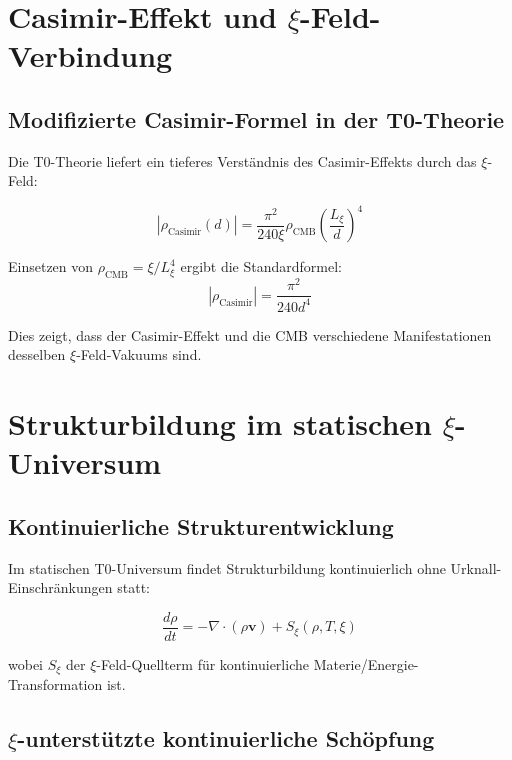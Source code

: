 \documentclass[12pt,a4paper]{article}
\theoremstyle{definition}
\theoremstyle{remark}
\begin{document}
	\section{Casimir-Effekt und $\xi$-Feld-Verbindung}
	
	\subsection{Modifizierte Casimir-Formel in der T0-Theorie}
	
	Die T0-Theorie liefert ein tieferes Verst\"andnis des Casimir-Effekts durch das $\xi$-Feld:
	
	\begin{equation}
		|\rho_{\text{Casimir}}(d)| = \frac{\pi^2}{240 \xi} \rho_{\text{CMB}} \left(\frac{L_\xi}{d}\right)^4
	\end{equation}
	
	Einsetzen von $\rho_{\text{CMB}} = \xi/L_\xi^4$ ergibt die Standardformel:
	\begin{equation}
		|\rho_{\text{Casimir}}| = \frac{\pi^2}{240 d^4}
	\end{equation}
	
	Dies zeigt, dass der Casimir-Effekt und die CMB verschiedene Manifestationen desselben $\xi$-Feld-Vakuums sind.
	
	\section{Strukturbildung im statischen $\xi$-Universum}
	
	\subsection{Kontinuierliche Strukturentwicklung}
	
	Im statischen T0-Universum findet Strukturbildung kontinuierlich ohne Urknall-Einschr\"ankungen statt:
	
	\begin{equation}
		\frac{d\rho}{dt} = -\nabla \cdot (\rho \mathbf{v}) + S_\xi(\rho, T, \xi)
	\end{equation}
	
	wobei $S_\xi$ der $\xi$-Feld-Quellterm f\"ur kontinuierliche Materie/Energie-Transformation ist.
	
	\subsection{$\xi$-unterst\"utzte kontinuierliche Sch\"opfung}
	
\end{document}
